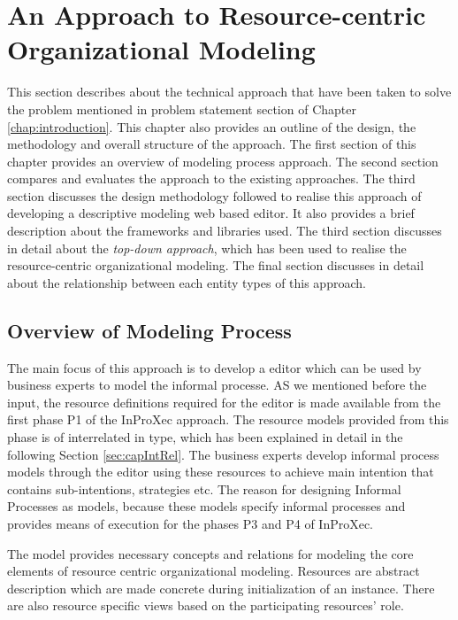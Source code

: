 \chapter{An Approach to Resource-centric Organizational Modeling}
\label{chap:approach}

This section describes about the technical approach that have been taken to solve the problem mentioned in problem statement section of Chapter \ref{chap:introduction}. This chapter also provides an outline of the design, the methodology and overall structure of the approach. The first section of this chapter provides an overview of modeling process approach. The second section compares and evaluates the approach to the existing approaches. The third section discusses the design methodology followed to realise this approach of developing a descriptive modeling web based editor. It also provides a brief description about the frameworks and libraries used. The third section discusses in detail about the \textit{top-down approach}, which has been used to realise the resource-centric organizational modeling. The final section discusses in detail about the relationship between each entity types of this approach. 

\section{Overview of Modeling Process}
\label{sec:overviewmodelingprocess}
The main focus of this approach is to develop a editor which can be used by business experts to model the informal processe. AS we mentioned before the input, the resource definitions required for the editor is made available from the first phase P1 of the InProXec approach. The resource models provided from this phase is of interrelated in type, which has been explained in detail in the following Section \ref{sec:capIntRel}. The business experts develop informal process models through the editor using these resources to achieve main intention that contains sub-intentions, strategies etc. The reason for designing Informal Processes as models, because these models specify informal processes and provides means of execution for the phases P3 and P4 of InProXec.  

The model provides necessary concepts and relations for modeling the core elements of resource centric organizational modeling. Resources are abstract description which are made concrete during initialization of an instance. There are also resource specific views based on the participating resources' role. 

